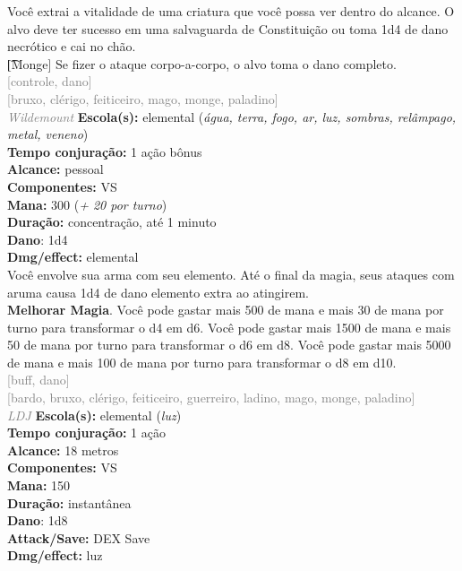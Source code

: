 \documentclass{RPG_Adventure}[2021/10/20]
\begin{document}
{\normalsize Você extrai a vitalidade de uma criatura que você possa ver dentro do alcance. O alvo deve ter sucesso em uma salvaguarda de Constituição ou toma 1d4 de dano necrótico e cai no chão.\\\t [Monge] Se fizer o ataque corpo-a-corpo, o alvo toma o dano completo.\\}
{\scriptsize \textcolor{gray}{[controle, dano]\\}}
{\scriptsize \textcolor{gray}{[bruxo, clérigo, feiticeiro, mago, monge, paladino]\\}}
{\tiny \textcolor{gray}{\textit{Wildemount}}}
{\small \t \textbf{Escola(s):} elemental (\textit{água, terra, fogo, ar, luz, sombras, relâmpago, metal, veneno})\\\t \textbf{Tempo conjuração:} 1 ação bônus\\\t \textbf{Alcance:} pessoal\\\t \textbf{Componentes:} VS\\\t \textbf{Mana:} 300 (\textit{+ 20 por turno})\\\t \textbf{Duração:} concentração, até 1 minuto\\\t \textbf{Dano}: 1d4\\\t \textbf{Dmg/effect:} elemental\\}
{\normalsize Você envolve sua arma com seu elemento. Até o final da magia, seus ataques com aruma causa 1d4 de dano elemento extra ao atingirem.\\\t \textbf{Melhorar Magia}. Você pode gastar mais 500 de mana e mais 30 de mana por turno para transformar o d4 em d6. Você pode gastar mais 1500 de mana e mais 50 de mana por turno para transformar o d6 em d8. Você pode gastar mais 5000 de mana e mais 100 de mana por turno para transformar o d8 em d10.\\}
{\scriptsize \textcolor{gray}{[buff, dano]\\}}
{\scriptsize \textcolor{gray}{[bardo, bruxo, clérigo, feiticeiro, guerreiro, ladino, mago, monge, paladino]\\}}
{\tiny \textcolor{gray}{\textit{LDJ}}}
{\small \t \textbf{Escola(s):} elemental (\textit{luz})\\\t \textbf{Tempo conjuração:} 1 ação\\\t \textbf{Alcance:} 18 metros\\\t \textbf{Componentes:} VS\\\t \textbf{Mana:} 150\\\t \textbf{Duração:} instantânea\\\t \textbf{Dano}: 1d8\\\t \textbf{Attack/Save:} DEX Save\\\t \textbf{Dmg/effect:} luz\\}
\end{document}
